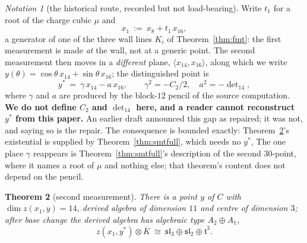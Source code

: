 \documentclass[11pt,reqno]{amsart}
\theoremstyle{plain}
\newtheorem{theorem}{Theorem}[section]
\theoremstyle{definition}
\theoremstyle{remark}
\newtheorem{notation}[theorem]{Notation}
\newcommand{\sll}{\mathfrak{sl}}
\begin{document}
\begin{notation}[the historical route, recorded but not load-bearing]\label{not:points}
Write $t_1$ for a root of the charge cubic $\mu$ and
\[
   x_1\ :=\ x_8+t_1\,x_{16},
\]
a generator of one of the three wall lines $K_i$ of Theorem~\ref{thm:fmt}: the first
measurement is made \emph{at} the wall, not at a generic point. The second measurement
then moves in a \emph{different} plane, $\langle x_{14},x_{16}\rangle$, along which we
write $y(\theta)=\cos\theta\,x_{14}+\sin\theta\,x_{16}$; the distinguished point is
\[
   y^*\ =\ \gamma\,x_{14}-a\,x_{16},\qquad \gamma^2=-C_2/2,\quad a^2=-\det\nolimits_{14},
\]
where $\gamma$ and $a$ are produced by the block-$12$ pencil of the source computation.
\textbf{We do not define $C_2$ and $\det_{14}$ here, and a reader cannot reconstruct
$y^*$ from this paper.} An earlier draft announced this gap as repaired; it was not, and
saying so is the repair. The consequence is bounded exactly:
Theorem~\ref{thm:smt}'s existential is supplied by Theorem~\ref{thm:smtfull}, which needs
no $y^*$, The one place $\gamma$ reappears is
Theorem~\ref{thm:smtfull}'s description of the second $30$-point, where it names a root
of $\mu$ and nothing else; that theorem's content does not depend on the pencil.
\end{notation}

\begin{theorem}[second measurement]\label{thm:smt}
There is a point $y$ of $C$ with $\dim z(x_1,y)=14$, derived algebra of
dimension $11$ and centre of dimension $3$; after base change the derived algebra has
algebraic type $A_2\oplus A_1$,
\[
   z(x_1,y^*)\otimes\overline K\ \cong\ \sll_3\oplus\sll_2\oplus\mathfrak t^{3}.
\]
\end{theorem}
\end{document}
